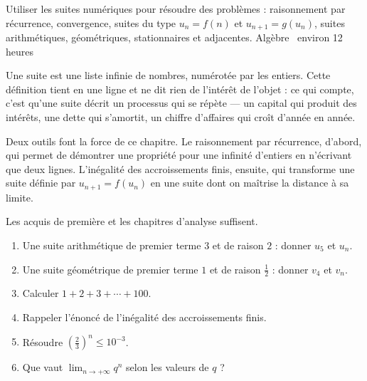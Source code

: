   {Utiliser les suites numériques pour résoudre des problèmes : raisonnement
   par récurrence, convergence, suites du type $u_{n}=f(n)$ et
   $u_{n+1}=g(u_{n})$, suites arithmétiques, géométriques, stationnaires et
   adjacentes.}
  {Algèbre \textbullet\ environ 12 heures}

Une suite est une liste infinie de nombres, numérotée par les entiers. Cette
définition tient en une ligne et ne dit rien de l'intérêt de l'objet : ce qui
compte, c'est qu'une suite décrit un processus qui se répète — un capital qui
produit des intérêts, une dette qui s'amortit, un chiffre d'affaires qui
croît d'année en année.

Deux outils font la force de ce chapitre. Le raisonnement par récurrence,
d'abord, qui permet de démontrer une propriété pour une infinité d'entiers en
n'écrivant que deux lignes. L'inégalité des accroissements finis, ensuite, qui
transforme une suite définie par $u_{n+1} = f(u_{n})$ en une suite dont on
maîtrise la distance à sa limite.

\begin{revision}
Les acquis de première et les chapitres d'analyse suffisent.

\begin{enumerate}[label=\textbf{\arabic*.}, leftmargin=*, itemsep=0.35em]
  \item Une suite arithmétique de premier terme $3$ et de raison $2$ :
        donner $u_{5}$ et $u_{n}$.
  \item Une suite géométrique de premier terme $1$ et de raison $\frac12$ :
        donner $v_{4}$ et $v_{n}$.
  \item Calculer $1+2+3+\cdots+100$.
  \item Rappeler l'énoncé de l'inégalité des accroissements finis.
  \item Résoudre $\left(\frac23\right)^{n} \leq 10^{-3}$.
  \item Que vaut $\lim_{n\to+\infty}q^{n}$ selon les valeurs de $q$ ?
\end{enumerate}
\end{revision}

